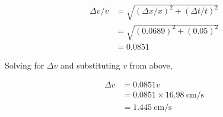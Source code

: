 \documentclass{article}
\begin{document}
\begin{enumerate}
\begin{solution}
		\begin{align*}
		 \Delta{v}/v &= \sqrt{\left(\Delta x / x \right)^2 + \left(\Delta t / t \right)^2} \\
		 &= \sqrt{\left(0.0689 \right)^2 + \left(0.05 \right)^2} \\
		 &= 0.0851
		\end{align*}
		
		Solving for $\Delta v$ and substituting $v$ from above,
		
		\begin{align*}
		 \Delta v &= 0.0851 v \\
		 &= 0.0851 \times 16.98\:\mathrm{cm}/\mathrm{s} \\
		 &= 1.445\:\mathrm{cm}/\mathrm{s}
		\end{align*}
	\end{solution}
	
\end{enumerate}
\end{document}

